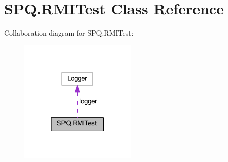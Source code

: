 \hypertarget{class_s_p_q_1_1_r_m_i_test}{}\section{S\+P\+Q.\+R\+M\+I\+Test Class Reference}
\label{class_s_p_q_1_1_r_m_i_test}


Collaboration diagram for S\+P\+Q.\+R\+M\+I\+Test\+:\nopagebreak
\begin{figure}[H]
\begin{center}
\leavevmode
\includegraphics[width=157pt]{class_s_p_q_1_1_r_m_i_test__coll__graph}
\end{center}
\end{figure}

